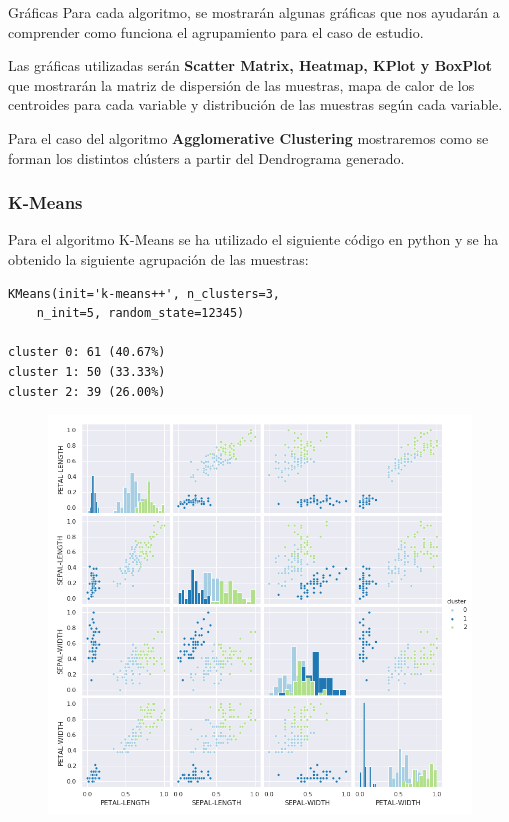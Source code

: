 \documentclass[spanish]{beamer}
\begin{document}
\begin{frame}{Gráficas}
Para cada algoritmo, se mostrarán algunas gráficas que nos ayudarán a comprender como funciona el agrupamiento para el caso de estudio.\break

Las gráficas utilizadas serán \textbf{Scatter Matrix, Heatmap, KPlot y BoxPlot} que mostrarán la matriz de dispersión de las muestras, mapa de calor de los centroides para cada variable y distribución de las muestras según cada variable.\break

Para el caso del algoritmo \textbf{Agglomerative Clustering} mostraremos como se forman los distintos clústers a partir del Dendrograma generado.
\end{frame}

\begin{frame}[fragile]
\frametitle{K-Means}
Para el algoritmo K-Means se ha utilizado el siguiente código en python y se ha obtenido la siguiente agrupación de las muestras:\break
\begin{lstlisting}
KMeans(init='k-means++', n_clusters=3, 
	n_init=5, random_state=12345)

cluster 0: 61 (40.67%)
cluster 1: 50 (33.33%)
cluster 2: 39 (26.00%)
\end{lstlisting}
\end{frame}

\begin{frame}
\begin{figure}[h]
\centering
\includegraphics[scale=0.34]{dani/scatmatrixK-MeansIRIS.png}
\end{figure}
\end{frame}
\end{document}
